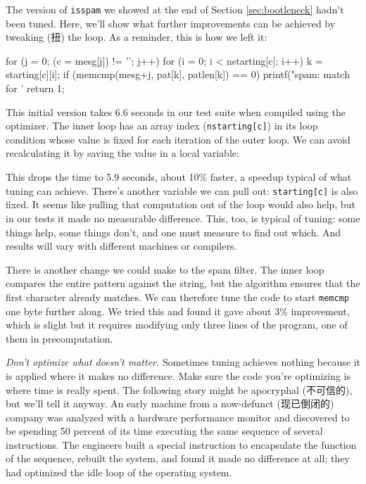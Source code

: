 The version of \verb'isspam' we showed at the end of Section
\ref{sec:bootleneck} hadn't been tuned. Here, we'll show what further
improvements can be achieved by tweaking (扭) the loop. As a reminder, this
is how we left it:
\begin{wellcode}
    for (j = 0; (c = mesg[j]) != '\0'; j++) {
        for (i = 0; i < nstarting[c]; i++) {
            k = starting[c][i];
            if (memcmp(mesg+j, pat[k], patlen[k]) == 0) {
                printf("spam: match for '%
                return 1;
            }
        }
    }
\end{wellcode}
This initial version takes 6.6 seconds in our test suite when compiled
using the optimizer. The inner loop has an array index
(\verb'nstarting[c]') in its loop condition whose value is fixed for each
iteration of the outer loop. We can avoid recalculating it by saving the
value in a local variable:
\begin{wellcode}
    for (j = 0; (c = mesg[j]) != '\0'; j++) {
        n = nstarting[c];
        for (i = 0; i < n; i++) {
            k = starting[c][i];
            ...
\end{wellcode}
This drops the time to 5.9 seconds, about 10\% faster, a speedup typical of
what tuning can achieve. There's another variable we can pull out:
\verb'starting[c]' is also fixed. It seems like pulling that computation
out of the loop would also help, but in our tests it made no measurable
difference. This, too, is typical of tuning: some things help, some things
don't, and one must measure to find out which. And results will vary with
different machines or compilers.

There is another change we could make to the spam filter. The inner loop
compares the entire pattern against the string, but the algorithm ensures
that the first character already matches. We can therefore tune the code to
start \verb'memcmp' one byte further along. We tried this and found it gave
about 3\% improvement, which is slight but it requires modifying only three
lines of the program, one of them in precomputation.

\emph{Don't optimize what doesn't matter.} Sometimes tuning achieves
nothing because it is applied where it makes no difference. Make sure the
code you're optimizing is where time is really spent. The following story
might be apocryphal (不可信的), but we'll tell it anyway. An early machine
from a now-defunct (现已倒闭的) company was analyzed with a hardware
performance monitor and discovered to be spending 50 percent of its time
executing the same sequence of several instructions. The engineers built a
special instruction to encapsulate the function of the sequence, rebuilt
the system, and found it made no difference at all; they had optimized the
idle loop of the operating system.


